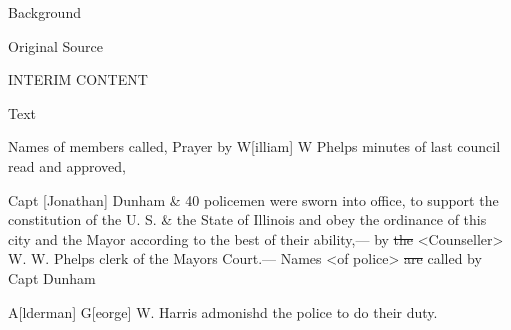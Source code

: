 			\begin{description}
				\item[Background]
			\end{description}
			
			
			\begin{description}
				\item[Original Source]
			\end{description}
			
				INTERIM CONTENT
			
			
			\begin{description}
				\item[Text]
			\end{description}
			

				Names of members called, Prayer by W[illiam] W Phelps minutes of last council read and approved,

				Capt [Jonathan] Dunham \& 40 policemen were sworn into office, to support the constitution of the U. S. \& the State of Illinois and obey the ordinance of this city and the Mayor according to the best of their ability,--- by \sout{the} <Counseller> W. W. Phelps clerk of the Mayors Court.--- Names <of police> \sout{are} called by Capt Dunham

				A[lderman] G[eorge] W. Harris admonishd the police to do their duty.


